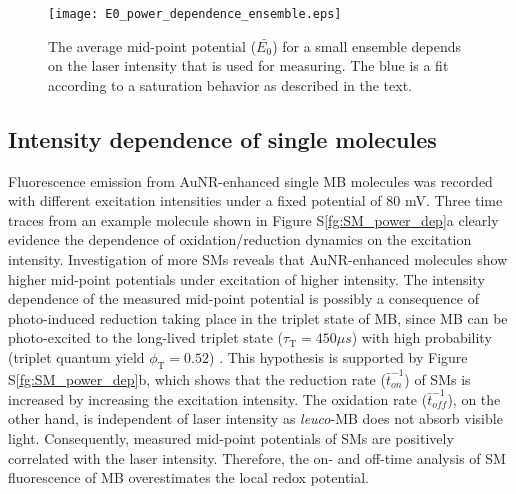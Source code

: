 \documentclass[11pt,a4paper,onecolumn]{article}
\begin{document}
\begin{figure}
  \centering
  \texttt{[image: E0\_power\_dependence\_ensemble.eps]}
	\makeatletter
	\renewcommand{\fnum@figure}{\figurename~S\thefigure}
	\makeatother
  \caption{The average mid-point potential ($\bar{E_0}$) for a small ensemble depends on the laser intensity that is used for measuring. 
	The blue is a fit according to a saturation behavior as described in the text. %
	}
  \label{fg:ensem_power_dep}
\end{figure}

\subsection{Intensity dependence of single molecules} 
Fluorescence emission from AuNR-enhanced single MB molecules was recorded with different excitation intensities under a fixed potential of 80 mV. %
Three time traces from an example molecule shown in Figure S\ref{fg:SM_power_dep}a clearly evidence the dependence of oxidation/reduction dynamics on the excitation intensity. Investigation of more SMs reveals that AuNR-enhanced molecules show higher mid-point potentials under excitation of higher intensity. %
The intensity dependence of the measured mid-point potential is possibly a consequence of photo-induced reduction taking place in the triplet state of MB, since MB can be photo-excited to the long-lived triplet state ($\tau_\mathrm{T} = 450  \mu s$) with high probability (triplet quantum yield $\phi_\mathrm{T} = 0.52$) \cite{Murovhandbook}. This hypothesis is supported by Figure S\ref{fg:SM_power_dep}b, which shows that the reduction rate ($\bar{t}_{on}^{-1}$) of SMs is increased by increasing the excitation intensity. The oxidation rate ($\bar{t}_{off}^{-1}$), on the other hand, is independent of laser intensity as \textit{leuco}-MB does not absorb visible light. Consequently, measured mid-point potentials of SMs are positively correlated with the laser intensity. Therefore, the on- and off-time analysis of SM fluorescence of MB overestimates the local redox potential. %
\end{document}
